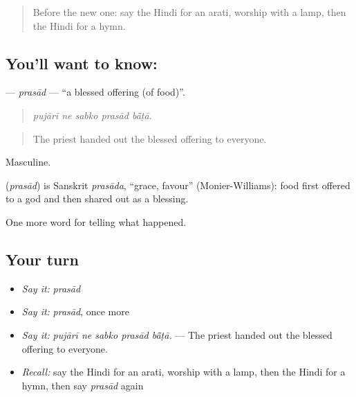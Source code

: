 \label{lesson:HI-C331-prasad}



\begin{quote}
Before the new one: say the Hindi for an arati, worship with a lamp, then the Hindi for a hymn.
\end{quote}

\subsection*{You'll want to know: }
\textbf{} — \emph{prasād} — \textquotedblleft{}a blessed offering (of food)\textquotedblright{}.

\begin{quote}
    
\end{quote}

\begin{quote}
\emph{pujārī ne sabko prasād bā̃ṭā.}
\end{quote}

\begin{quote}
The priest handed out the blessed offering to everyone.
\end{quote}

Masculine.

\begin{cousinweb}
\textbf{} (\emph{prasād}) is Sanskrit \emph{prasāda}, \textquotedblleft{}grace, favour\textquotedblright{} (Monier-Williams): food first offered to a god and then shared out as a blessing.
\end{cousinweb}

\begin{grammarlens}[title={What you've built}]
One more word for telling what happened.
\end{grammarlens}

\subsection*{Your turn}
\begin{itemize}
\raggedright
  \item \emph{Say it:} \emph{prasād}
  \item \emph{Say it:} \emph{prasād}, once more
  \item \emph{Say it:} \emph{pujārī ne sabko prasād bā̃ṭā.} — The priest handed out the blessed offering to everyone.
  \item \emph{Recall:} say the Hindi for an arati, worship with a lamp, then the Hindi for a hymn, then say \emph{prasād} again
\end{itemize}

